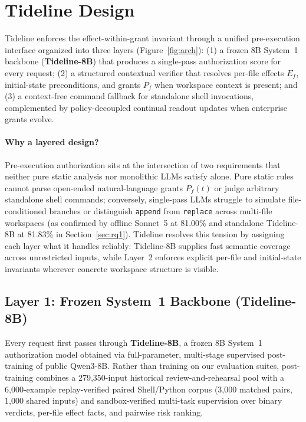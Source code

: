 \documentclass[sigconf,anonymous,nonacm]{acmart}
\begin{document}
\section{Tideline Design}\label{sec:design}
Tideline enforces the effect-within-grant invariant through a unified pre-execution interface organized into three layers (Figure~\ref{fig:arch}): (1) a frozen 8B System~1 backbone (\textbf{Tideline-8B}) that produces a single-pass authorization score for every request; (2) a structured contextual verifier that resolves per-file effects $E_f$, initial-state preconditions, and grants $P_f$ when workspace context is present; and (3) a context-free command fallback for standalone shell invocations, complemented by policy-decoupled continual readout updates when enterprise grants evolve.

\paragraph{Why a layered design?}
Pre-execution authorization sits at the intersection of two requirements that neither pure static analysis nor monolithic LLMs satisfy alone. Pure static rules cannot parse open-ended natural-language grants $P_f(t)$ or judge arbitrary standalone shell commands; conversely, single-pass LLMs struggle to simulate file-conditioned branches or distinguish \texttt{append} from \texttt{replace} across multi-file workspaces (as confirmed by offline Sonnet~5 at 81.00\% and standalone Tideline-8B at 81.83\% in Section~\ref{sec:rq1}). Tideline resolves this tension by assigning each layer what it handles reliably: Tideline-8B supplies fast semantic coverage across unrestricted inputs, while Layer~2 enforces explicit per-file and initial-state invariants wherever concrete workspace structure is visible.

\subsection{Layer 1: Frozen System~1 Backbone (Tideline-8B)}
Every request first passes through \textbf{Tideline-8B}, a frozen 8B System~1 authorization model obtained via full-parameter, multi-stage supervised post-training of public Qwen3-8B. Rather than training on our evaluation suites, post-training combines a 279,350-input historical review-and-rehearsal pool with a 6,000-example replay-verified paired Shell/Python corpus (3,000 matched pairs, 1,000 shared inputs) and sandbox-verified multi-task supervision over binary verdicts, per-file effect facts, and pairwise risk ranking.
\end{document}
